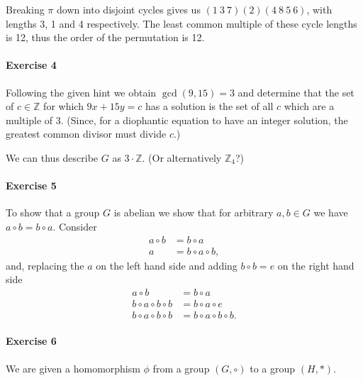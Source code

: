 \documentclass{article}
\begin{document}
Breaking $\pi$ down into disjoint cycles gives us $(1\ 3\ 7)(2)(4\ 8\ 5\ 6)$, with lengths 3, 1 and 4 respectively. The least common multiple of these cycle lengths is 12, thus the order of the permutation is 12.

\paragraph{Exercise 4}

Following the given hint we obtain $\gcd(9, 15) = 3$ and determine that the set of $c \in \mathbb{Z}$ for which $9x + 15y = c$ has a solution is the set of all $c$ which are a multiple of 3. (Since, for a diophantic equation to have an integer solution, the greatest common divisor must divide $c$.)

We can thus describe $G$ as $3 \cdot \mathbb{Z}$. (Or alternatively $\mathbb{Z}_4$?)

\paragraph{Exercise 5}

To show that a group $G$ is abelian we show that for arbitrary $a, b \in G$ we have $a \circ b = b \circ a$. Consider
\begin{align*}
    a \circ b &= b \circ a \\
    a &= b \circ a \circ b,
\end{align*}
and, replacing the $a$ on the left hand side and adding $b \circ b = e$ on the right hand side
\begin{align*}
    a \circ b &= b \circ a \\
    b \circ a \circ b \circ b &= b \circ a \circ e \\
    b \circ a \circ b \circ b &= b \circ a \circ b \circ b.
\end{align*}

\paragraph{Exercise 6}

We are given a homomorphism $\phi$ from a group $(G, \circ)$ to a group $(H, *)$.
\end{document}
